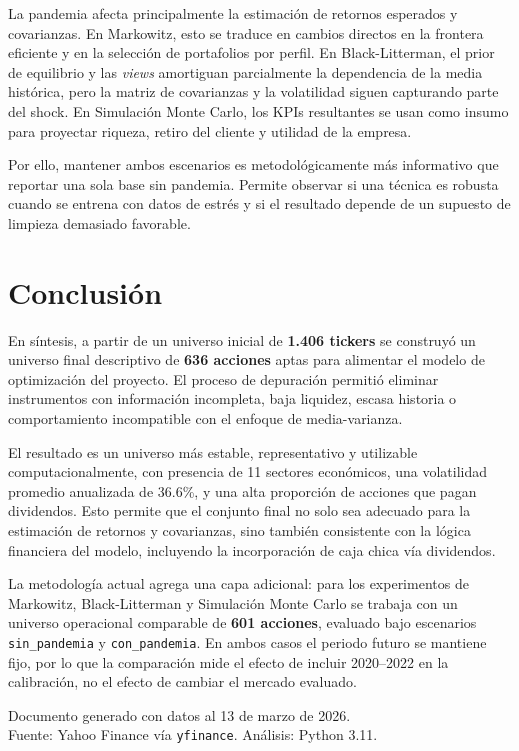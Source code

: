 La pandemia afecta principalmente la estimación de retornos esperados y
covarianzas. En Markowitz, esto se traduce en cambios directos en la frontera
eficiente y en la selección de portafolios por perfil. En Black-Litterman, el
prior de equilibrio y las \textit{views} amortiguan parcialmente la dependencia
de la media histórica, pero la matriz de covarianzas y la volatilidad siguen
capturando parte del shock. En Simulación Monte Carlo, los KPIs resultantes se
usan como insumo para proyectar riqueza, retiro del cliente y utilidad de la
empresa.

Por ello, mantener ambos escenarios es metodológicamente más informativo que
reportar una sola base sin pandemia. Permite observar si una técnica es robusta
cuando se entrena con datos de estrés y si el resultado depende de un supuesto
de limpieza demasiado favorable.

\section*{Conclusión}

En síntesis, a partir de un universo inicial de \textbf{1.406 tickers}
se construyó un universo final descriptivo de \textbf{636 acciones} aptas para
alimentar el modelo de optimización del proyecto. El proceso de depuración
permitió eliminar instrumentos con información incompleta, baja liquidez,
escasa historia o comportamiento incompatible con el enfoque de media-varianza.

El resultado es un universo más estable, representativo y utilizable
computacionalmente, con presencia de 11 sectores económicos, una volatilidad
promedio anualizada de 36.6\%, y una alta proporción de acciones que pagan
dividendos. Esto permite que el conjunto final no solo sea adecuado para la
estimación de retornos y covarianzas, sino también consistente con la lógica
financiera del modelo, incluyendo la incorporación de caja chica vía dividendos.

La metodología actual agrega una capa adicional: para los experimentos de
Markowitz, Black-Litterman y Simulación Monte Carlo se trabaja con un universo
operacional comparable de \textbf{601 acciones}, evaluado bajo escenarios
\texttt{sin\_pandemia} y \texttt{con\_pandemia}. En ambos casos el periodo
futuro se mantiene fijo, por lo que la comparación mide el efecto de incluir
2020--2022 en la calibración, no el efecto de cambiar el mercado evaluado.

\vspace{1em}
\begin{center}
  \small
  Documento generado con datos al 13 de marzo de 2026.\\
  Fuente: Yahoo Finance vía \texttt{yfinance}. Análisis: Python 3.11.
\end{center}
